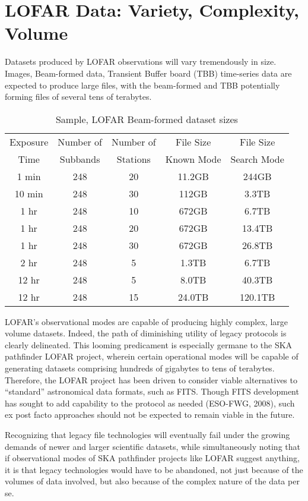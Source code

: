 \documentclass[11pt,twoside]{article}
\begin{document}
\section{LOFAR Data: Variety, Complexity, Volume}
Datasets produced by LOFAR observations will vary tremendously in size.  Images, Beam-formed data,
Transient Buffer board (TBB)  time-series data are expected to produce large files, with the beam-formed
and TBB potentially forming files of several tens of terabytes.
\begin{table}[hbt]
  \centering
  \begin{tabular}{|ccccc|}
    \hline
    \sc Exposure & \sc Number of & \sc Number of & \sc File Size  & \sc File Size  \\
    \sc Time     & \sc Subbands  & \sc Stations  & \sc Known Mode & \sc Search Mode \\
    \hline \hline
     1 min & 248 & 20 & 11.2GB & 244GB \\
\hline
     10 min & 248 & 30 & 112GB & 3.3TB \\
\hline
     1 hr  & 248 & 10 & 672GB & 6.7TB \\
     1 hr  & 248 & 20 & 672GB & 13.4TB\\
     1 hr  & 248 & 30 & 672GB & 26.8TB \\
\hline
     2 hr  & 248 & 5 & 1.3TB & 6.7TB \\
\hline
     12 hr & 248 & 5 & 8.0TB & 40.3TB \\
     12 hr & 248 & 15 & 24.0TB & 120.1TB \\
    \hline
 \end{tabular}
  \caption{Sample, LOFAR Beam-formed dataset sizes}
  \label{tab:data size}
\end{table}
LOFAR’s observational modes are capable of producing highly complex, large volume datasets. Indeed,
the path of diminishing utility of legacy protocols is clearly delineated.
This looming predicament is especially germane to the SKA pathfinder LOFAR project, wherein certain
operational modes will be capable of generating datasets comprising hundreds of gigabytes to tens of terabytes.
Therefore, the LOFAR project has been driven to consider viable alternatives to ``standard'' astronomical data formats,
such as FITS.  Though FITS development has sought to add capability to the protocol as needed (ESO-FWG, 2008),
such ex post facto approaches should not be expected to remain viable in the future.

Recognizing that legacy file technologies will eventually fail under the growing
demands of newer and larger scientific datasets, while simultaneously noting that
if observational modes of SKA pathfinder projects like LOFAR suggest anything,
it is that legacy technologies would have to be abandoned, not just because of
the volumes of data involved, but also because of the complex nature of the data per se.
\end{document}
